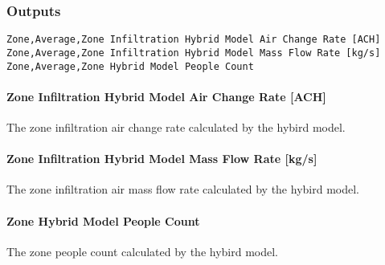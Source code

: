 \subsubsection{Outputs}\label{outputs-030}

\begin{lstlisting}
Zone,Average,Zone Infiltration Hybrid Model Air Change Rate [ACH]
Zone,Average,Zone Infiltration Hybrid Model Mass Flow Rate [kg/s]
Zone,Average,Zone Hybrid Model People Count
\end{lstlisting}

\paragraph{Zone Infiltration Hybrid Model Air Change Rate {[}ACH{]}}\label{zone-infiltration-hybrid-model-air-change-rate}

The zone infiltration air change rate calculated by the hybird model.

\paragraph{Zone Infiltration Hybrid Model Mass Flow Rate {[}kg/s{]}}\label{zone-infiltration-hybrid-model-air-mass-flow-rate}

The zone infiltration air mass flow rate calculated by the hybird model.

\paragraph{Zone Hybrid Model People Count}\label{zone-infiltration-hybrid-model-people-count}

The zone people count calculated by the hybird model.